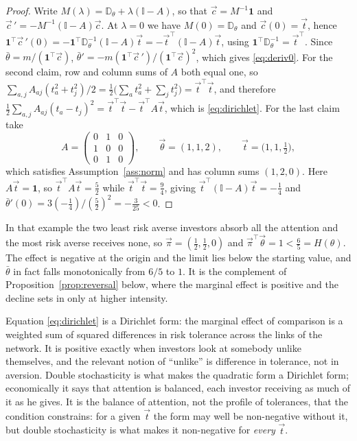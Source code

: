 \documentclass[12pt]{article}
\theoremstyle{definition}
\theoremstyle{remark}
\newcommand{\bth}{\bar\theta}
\newcommand{\D}{\mathbb{D}}
\begin{document}
\begin{proof}
Write $M(\lambda)=\D_{\theta}+\lambda(\mathbb{I}-A)$, so that
$\vec c=M^{-1}\mathbf 1$ and
$\vec c\,'=-M^{-1}(\mathbb{I}-A)\vec c$. At $\lambda=0$ we have
$M(0)=\D_{\theta}$ and $\vec c(0)=\vec t$, hence
$\mathbf 1^{\top}\vec c\,'(0)=-\mathbf 1^{\top}\D_{\theta}^{-1}(\mathbb{I}-A)\vec t
=-\vec t^{\top}(\mathbb{I}-A)\vec t$, using
$\mathbf 1^{\top}\D_{\theta}^{-1}=\vec t^{\top}$. Since
$\bth=m/(\mathbf 1^{\top}\vec c)$,
$\bth'=-m(\mathbf 1^{\top}\vec c\,')/(\mathbf 1^{\top}\vec c)^{2}$, which gives
\eqref{eq:deriv0}. For the second claim, row and column sums of $A$ both equal
one, so
$\sum_{a,j}A_{aj}(t_a^{2}+t_j^{2})/2
=\tfrac12\big(\sum_at_a^{2}+\sum_jt_j^{2}\big)=\vec t^{\top}\vec t$, and
therefore
$\tfrac12\sum_{a,j}A_{aj}(t_a-t_j)^{2}
=\vec t^{\top}\vec t-\vec t^{\top}A\vec t$, which is \eqref{eq:dirichlet}. For
the last claim take
%
\begin{equation*}
A=\begin{pmatrix}0&1&0\\1&0&0\\0&1&0\end{pmatrix},
\qquad
\vec\theta=(1,1,2),
\qquad
\vec t=\big(1,1,\tfrac12\big),
\end{equation*}
%
which satisfies Assumption~\ref{ass:norm} and has column sums $(1,2,0)$. Here
$A\vec t=\mathbf 1$, so $\vec t^{\top}A\vec t=\tfrac52$ while
$\vec t^{\top}\vec t=\tfrac94$, giving
$\vec t^{\top}(\mathbb{I}-A)\vec t=-\tfrac14$ and
$\bth'(0)=3(-\tfrac14)/(\tfrac52)^{2}=-\tfrac{3}{25}<0$.
\end{proof}

In that example the two least risk averse investors absorb all the attention and
the most risk averse receives none, so $\vec\pi=(\tfrac12,\tfrac12,0)$ and
$\vec\pi^{\top}\vec\theta=1<\tfrac65=H(\theta)$. The effect is negative at the
origin and the limit lies below the starting value, and $\bth$ in fact falls
monotonically from $6/5$ to $1$. It is the complement of
Proposition~\ref{prop:reversal} below, where the marginal effect is positive and
the decline sets in only at higher intensity.

Equation \eqref{eq:dirichlet} is a Dirichlet form: the marginal effect of
comparison is a weighted sum of squared differences in risk tolerance across
the links of the network. It is positive exactly when investors look at
somebody unlike themselves, and the relevant notion of ``unlike'' is difference
in tolerance, not in aversion. Double stochasticity is what makes the quadratic
form a Dirichlet form; economically it says that attention is balanced, each
investor receiving as much of it as he gives. It is the balance of attention,
not the profile of tolerances, that the condition constrains: for a given
$\vec t$ the form may well be non-negative without it, but double stochasticity
is what makes it non-negative for \emph{every} $\vec t$.
\end{document}
